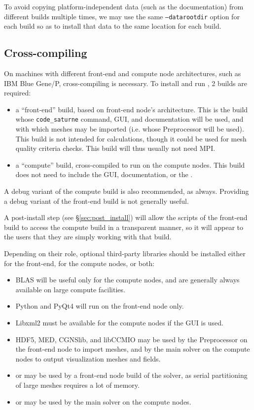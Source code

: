 \documentclass[a4paper,10pt,twoside]{csshortdoc}
\begin{document}
To avoid copying platform-independent data (such as the documentation)
from different builds multiple times, we may use the same
\texttt{--datarootdir} option for each build so as to install that
data to the same location for each build.

\subsection{Cross-compiling}

On machines with different front-end and compute node architectures,
such as IBM Blue Gene/P, cross-compiling is necessary.
To install and run \CS, 2 builds are required:

\begin{itemize}
\item a ``front-end'' build, based on front-end node's architecture. This is
      the build whose \texttt{code\_saturne} command, GUI, and documentation
      will be used, and with which meshes may be imported (i.e. whose
      Preprocessor will be used). This build is not intended for calculations,
      though it could be used for mesh quality criteria checks.
      This build will thus usually not need  MPI.
\item a ``compute'' build, cross-compiled to run on the compute nodes.
      This build does not need to include the GUI, documentation, or
      the \pcs.
\end{itemize}

A debug variant of the compute build is also recommended, as always.
Providing a debug variant of the front-end build is not generally useful.

A post-install step (see \S\ref{sec:post_install}) will allow
the scripts of the front-end build to access the compute build in a transparent
manner, so it will appear to the users that they are simply working with that
build.

Depending on their role, optional third-party libraries should be installed
either for the front-end, for the compute nodes, or both:

\begin{itemize}
\item BLAS will be useful only for the compute nodes, and are generally
      always available on large compute facilities.
\item Python and PyQt4 will run on the front-end node only.
\item Libxml2 must be available for the compute nodes if the GUI is used.
\item HDF5, MED, CGNSlib, and libCCMIO may be used by the Preprocessor on
      the front-end node to import meshes, and by the main solver on the
      compute nodes to output visualization meshes and fields.
\item \scotch or \metis may be used by a front-end node build of the
      solver, as serial partitioning of large meshes requires a lot of memory.
\item \ptscotch or \parmetis may be used by the main solver on the
      compute nodes.
\end{itemize}
\end{document}
